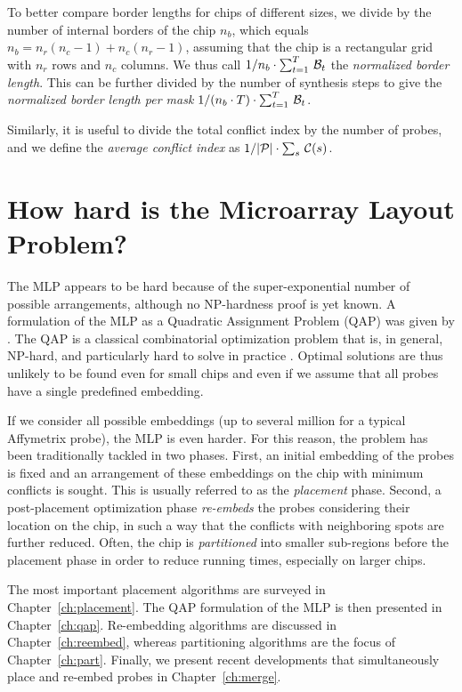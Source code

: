 To better compare border lengths for chips of different sizes, we divide by the
number of internal borders of the chip $n_b$, which equals
$n_b = n_r(n_c - 1) + n_c(n_r - 1)$, assuming that the chip is a rectangular
grid with $n_r$ rows and $n_c$ columns. We thus call
$1/n_b \cdot \sum_{t=1}^T\, {\mathcal{B}}_t$ the \emph{normalized border length}. This
can be further divided by the number of synthesis steps to give the
\emph{normalized border length per mask}
$1/(n_b \cdot T) \cdot \sum_{t=1}^T\, {\mathcal{B}}_t$.

Similarly, it is useful to divide the total conflict index by the number of
probes, and we define the \emph{average conflict index} as
$1/|{\mathcal{P}}| \cdot \sum_s\, {\mathcal{C}}(s)$.

\section{How hard is the Microarray Layout Problem?}
\label{sec:mlp_how_hard}

The MLP appears to be hard because of the super-exponential number of possible
arrangements, although no NP-hardness proof is yet known. A formulation of the
MLP as a Quadratic Assignment Problem (QAP) was given by \citet{Carvalho2006a}.
The QAP is a classical combinatorial optimization problem that is, in general,
NP-hard, and particularly hard to solve in practice \citep{Cela1997}. Optimal
solutions are thus unlikely to be found even for small chips and even if we
assume that all probes have a single predefined embedding.

If we consider all possible embeddings (up to several million for a typical
Affymetrix probe), the MLP is even harder. For this reason, the problem has been
traditionally tackled in two phases. First, an initial embedding of the probes
is fixed and an arrangement of these embeddings on the chip with minimum
conflicts is sought. This is usually referred to as the \emph{placement} phase.
Second, a post-placement optimization phase \emph{re-embeds} the probes
considering their location on the chip, in such a way that the conflicts with
neighboring spots are further reduced. Often, the chip is \emph{partitioned}
into smaller sub-regions before the placement phase in order to reduce running
times, especially on larger chips.

The most important placement algorithms are surveyed in
Chapter~\ref{ch:placement}. The QAP formulation of the MLP is then presented in
Chapter~\ref{ch:qap}. Re-embedding algorithms are discussed in
Chapter~\ref{ch:reembed}, whereas partitioning algorithms are the focus of
Chapter~\ref{ch:part}. Finally, we present recent developments that
simultaneously place and re-embed probes in Chapter~\ref{ch:merge}.

